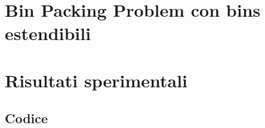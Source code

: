 \chapter{Bin Packing Problem con bins estendibili}


\chapter{Risultati sperimentali}


\printbibliography[heading=bibintoc]

\begin{appendices}
	\section*{Codice}
		\label{sec:Codice}
		\inputminted[linenos, breaklines, tabsize=2]{python3}{../SourceCode/Bin-Packing-Problem-Analysis.py}
\end{appendices}


